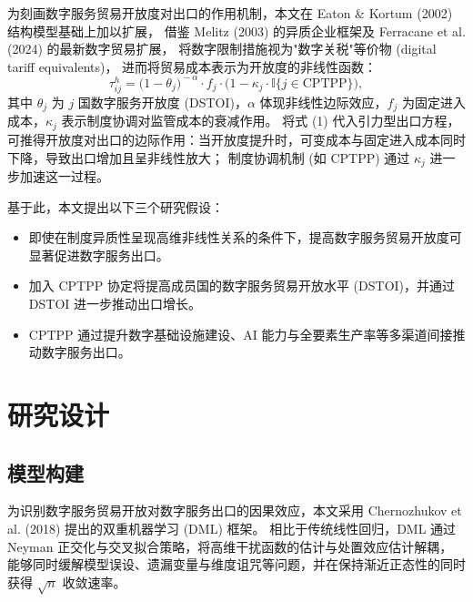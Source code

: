 \documentclass[11pt,a4paper]{article}
\begin{document}
为刻画数字服务贸易开放度对出口的作用机制，本文在 Eaton \& Kortum (2002) 结构模型基础上加以扩展，
借鉴 Melitz (2003) 的异质企业框架及 Ferracane et al. (2024) 的最新数字贸易扩展，
将数字限制措施视为"数字关税"等价物 (digital tariff equivalents)，
进而将贸易成本表示为开放度的非线性函数：
\begin{equation}
\tau_{ij}^h = \big(1 - \theta_j\big)^{\!-\alpha} \cdot f_{j} \cdot \big(1 - \kappa_{j} \cdot \mathbb{I}\{j \in \mathrm{CPTPP}\}\big),
\end{equation}
其中 $\theta_j$ 为 $j$ 国数字服务开放度 (DSTOI)，$\alpha$ 体现非线性边际效应，$f_j$ 为固定进入成本，$\kappa_j$ 表示制度协调对监管成本的衰减作用。
将式 (1) 代入引力型出口方程，可推得开放度对出口的边际作用：当开放度提升时，可变成本与固定进入成本同时下降，导致出口增加且呈非线性放大；
制度协调机制 (如 CPTPP) 通过 $\kappa_j$ 进一步加速这一过程。

基于此，本文提出以下三个研究假设：

\begin{itemize}[leftmargin=2em]
\item[\textbf{H1}：] 即使在制度异质性呈现高维非线性关系的条件下，提高数字服务贸易开放度可显著促进数字服务出口。
\item[\textbf{H2}：] 加入 CPTPP 协定将提高成员国的数字服务贸易开放水平 (DSTOI)，并通过 DSTOI 进一步推动出口增长。
\item[\textbf{H3}：] CPTPP 通过提升数字基础设施建设、AI 能力与全要素生产率等多渠道间接推动数字服务出口。
\end{itemize}

\section{研究设计}

\subsection{模型构建}

为识别数字服务贸易开放对数字服务出口的因果效应，本文采用 Chernozhukov et al. (2018) 提出的双重机器学习 (DML) 框架。
相比于传统线性回归，DML 通过 Neyman 正交化与交叉拟合策略，将高维干扰函数的估计与处置效应估计解耦，
能够同时缓解模型误设、遗漏变量与维度诅咒等问题，并在保持渐近正态性的同时获得 $\sqrt{n}$ 收敛速率。
\end{document}

